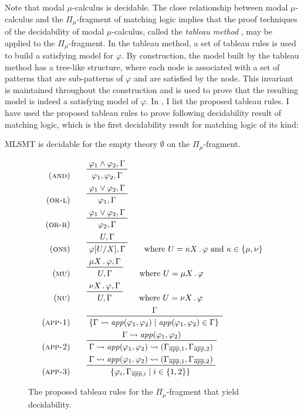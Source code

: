\documentclass[11pt]{article}
\begin{document}
Note that modal $\mu$-calculus is decidable. 
The close relationship between modal $\mu$-calculus and the $\Pi_\mu$-fragment
of matching logic implies that the proof techniques of the decidability of 
modal $\mu$-calculus,
called the \emph{tableau method} \cite{NW96}, 
may be applied to the $\Pi_\mu$-fragment. 
In the tableau method, a set of tableau rules is used to build a satisfying 
model for $\varphi$. 
By construction, the model built by the tableau method has a tree-like 
structure, where each node is associated with a set of patterns that are 
sub-patterns of $\varphi$ and are satisfied by the node. 
This invariant is maintained throughout the construction and is used to prove 
that the resulting model is indeed a satisfying model of $\varphi$. 
In , I list the proposed tableau rules.
I have used the proposed tableau rules to prove following decidability result of matching logic, which is the first decidability result for matching logic of its kind:
\begin{theorem}
MLSMT is decidable for the empty theory $\emptyset$ on the 
$\Pi_\mu$-fragment.
\end{theorem}

\begin{figure}[t]
\begin{align*}
\prule{and}
&\qquad \prftree{\varphi_1 \land \varphi_2 ,
\Gamma}{\varphi_1,\varphi_2,\Gamma}
\\
\prule{or-l}
&\qquad \prftree{\varphi_1 \lor \varphi_2, \Gamma}{\varphi_1,\Gamma}
\\
\prule{or-r}
&\qquad \prftree{\varphi_1 \lor \varphi_2, \Gamma}{\varphi_2,\Gamma}
\\
\prule{ons}
&\qquad \prftree{U, \Gamma}{\varphi[U/X], \Gamma}
\qquad\text{where $U = \kappa X \ld \varphi$ and $\kappa \in
\{\mu,\nu\}$}
\\
\prule{mu}
&\qquad \prftree{\mu X \ld \varphi, \Gamma}{U,\Gamma}
\qquad\text{where $U = \mu X \ld \varphi$}
\\
\prule{nu}
&\qquad \prftree{\nu X \ld \varphi, \Gamma}{U,\Gamma}
\qquad\text{where $U = \nu X \ld \varphi$}
\\
\prule{app-1}
&\qquad \prftree
{\Gamma}{\left\{ \Gamma \fl
\app(\varphi_1,\varphi_2)
 \mid \app(\varphi_1,\varphi_2) \in \Gamma \right\} }
\\
\prule{app-2}
&\qquad \prftree{\Gamma \fl \app(\varphi_1,\varphi_2)}
{ \Gamma \fl \app(\varphi_1,\varphi_2) \fl \left( \Gapa, \Gapb \right) }
\\
\prule{app-3}
&\qquad \prftree{\Gamma \fl \app(\varphi_1,\varphi_2) \fl \left( \Gapa, \Gapb 
\right) } {\left\{ \varphi_i, \Gamma_{\overline{\app},i} \mid i \in \{1,2\} 
\right\}}
\end{align*}
\caption{The proposed tableau rules for the $\Pi_\mu$-fragment that yield decidability.}
\label{fig:tableau}
\end{figure}
\end{document}
